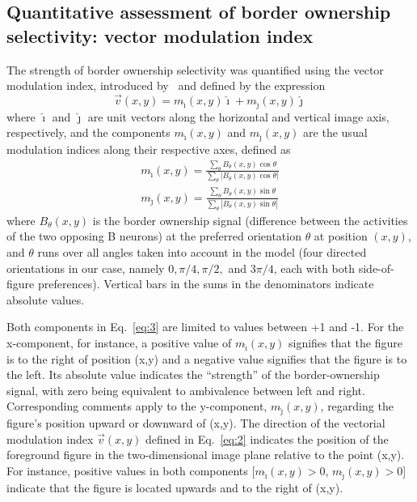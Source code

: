 \subsection{Quantitative assessment of border ownership selectivity:
  vector modulation index}
\label{sec:vmi}

The strength of border ownership selectivity was quantified using the
vector modulation index, introduced by~\cite{Craft_etal07} and defined
by the expression 
\begin{equation}
\label{eq:2}
\vec{v}(x,y) = m_{\hat{\imath}}(x,y)\hat{\imath} + m_{\hat{\jmath}}(x,y)\hat{\jmath}
\end{equation}
where $\hat{\imath}$ and $\hat{\jmath}$ are unit vectors along the horizontal and vertical image
axis, respectively, and the components $m_{\hat{\imath}}(x,y)$ and $m_{\hat{\jmath}}(x,y)$ are the usual modulation indices along their respective axes, defined as
\begin{equation}
\label{eq:3}
\begin{split}
	m_{\hat{\imath}}(x,y) = \frac{\sum_{\theta}
        B_{\theta}(x,y)\cos\theta}{\sum_{\theta}
                \left|B_{\theta}(x,y)\cos\theta\right|} \\
	m_{\hat{\jmath}}(x,y) = \frac{\sum_{\theta}
        B_{\theta}(x,y)\sin\theta}{\sum_{\theta}
                \left|B_{\theta}(x,y)\sin\theta\right|}
\end{split}
\end{equation}
where $B_{\theta}(x,y)$ is the border ownership signal (difference between
the activities of the two opposing B neurons) at the preferred
orientation $\theta$ at position $(x,y)$, and $\theta$ runs over all
angles taken into account in the model 
(four directed orientations in our case, namely $0, \pi/4, \pi/2,$
and $3\pi/4$, each with both side-of-figure preferences). 
Vertical bars in the sums in the denominators indicate absolute values.

Both components in Eq.~\ref{eq:3} are limited to values between +1 and
-1. For the x-component, for instance, a positive value of
$m_{\hat{\imath}}(x,y)$ signifies that the figure is to the right of
position (x,y) and a negative value signifies that the figure is to
the left. Its absolute value indicates the ``strength'' of the
border-ownership signal, with zero being equivalent to ambivalence
between left and right. Corresponding comments apply to the
y-component, $m_{\hat{\jmath}}(x,y)$, regarding the figure's position
upward or downward of (x,y). The direction of the vectorial modulation
index $\vec{v}(x,y)$ defined in Eq.~\ref{eq:2} indicates the position
of the foreground figure in the two-dimensional image plane relative
to the point (x,y). For instance, positive values in both components
[$m_{\hat{\imath}}(x,y) > 0$, $m_{\hat{\jmath}}(x,y) > 0$] indicate
that the figure is located upwards and to the right of (x,y).

